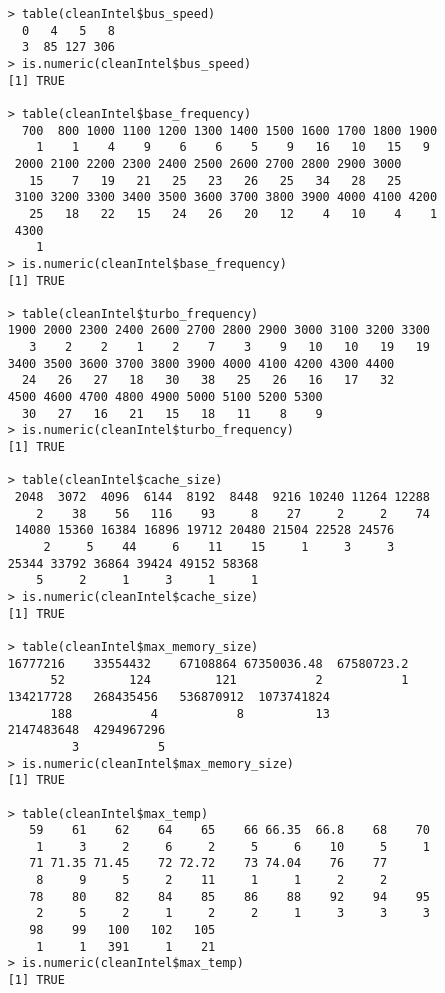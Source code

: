 \documentclass[a4paper]{article}
\begin{document}
\begin{itemize}
\begin{lstlisting}
    > table(cleanIntel$bus_speed)
      0   4   5   8 
      3  85 127 306 
    > is.numeric(cleanIntel$bus_speed)
    [1] TRUE
    
    > table(cleanIntel$base_frequency)
      700  800 1000 1100 1200 1300 1400 1500 1600 1700 1800 1900
        1    1    4    9    6    6    5    9   16   10   15   9
     2000 2100 2200 2300 2400 2500 2600 2700 2800 2900 3000 
       15    7   19   21   25   23   26   25   34   28   25
     3100 3200 3300 3400 3500 3600 3700 3800 3900 4000 4100 4200
       25   18   22   15   24   26   20   12    4   10    4    1
     4300
        1
    > is.numeric(cleanIntel$base_frequency)
    [1] TRUE
    
    > table(cleanIntel$turbo_frequency)
    1900 2000 2300 2400 2600 2700 2800 2900 3000 3100 3200 3300
       3    2    2    1    2    7    3    9   10   10   19   19
    3400 3500 3600 3700 3800 3900 4000 4100 4200 4300 4400 
      24   26   27   18   30   38   25   26   16   17   32
    4500 4600 4700 4800 4900 5000 5100 5200 5300
      30   27   16   21   15   18   11    8    9 
    > is.numeric(cleanIntel$turbo_frequency)
    [1] TRUE
    
    > table(cleanIntel$cache_size)
     2048  3072  4096  6144  8192  8448  9216 10240 11264 12288
        2    38    56   116    93     8    27     2     2    74
     14080 15360 16384 16896 19712 20480 21504 22528 24576 
         2     5    44     6    11    15     1     3     3
    25344 33792 36864 39424 49152 58368 
        5     2     1     3     1     1 
    > is.numeric(cleanIntel$cache_size)
    [1] TRUE
    
    > table(cleanIntel$max_memory_size)
    16777216    33554432    67108864 67350036.48  67580723.2
          52         124         121           2           1
    134217728   268435456   536870912  1073741824 
          188           4           8          13
    2147483648  4294967296 
             3           5 
    > is.numeric(cleanIntel$max_memory_size)
    [1] TRUE
    
    > table(cleanIntel$max_temp)
       59    61    62    64    65    66 66.35  66.8    68    70
        1     3     2     6     2     5     6    10     5     1
       71 71.35 71.45    72 72.72    73 74.04    76    77 
        8     9     5     2    11     1     1     2     2
       78    80    82    84    85    86    88    92    94    95
        2     5     2     1     2     2     1     3     3     3
       98    99   100   102   105
        1     1   391     1    21
    > is.numeric(cleanIntel$max_temp)
    [1] TRUE
    \end{lstlisting}
\end{itemize}
\end{document}
